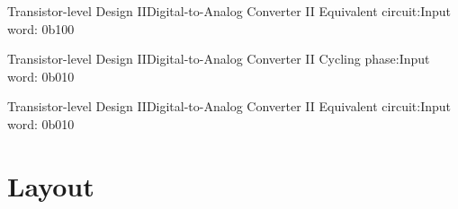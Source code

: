 \documentclass{beamer}
\begin{document}
 \begin{frame}{Transistor-level Design II}{Digital-to-Analog Converter II}
  Equivalent circuit:\hfill Input word: \alert{0b100}
  \vspace*{1em}
  \begin{center}
   
  \end{center}
 \end{frame}

 \begin{frame}{Transistor-level Design II}{Digital-to-Analog Converter II}
  Cycling phase:\hfill Input word: \alert{0b010}
  \vspace*{1em}
  \begin{center}
   
  \end{center}
 \end{frame}

 \begin{frame}{Transistor-level Design II}{Digital-to-Analog Converter II}
  Equivalent circuit:\hfill Input word: \alert{0b010}
  \vspace*{1em}
  \begin{center}
   
  \end{center}
 \end{frame}
 \section{Layout}
\end{document}
